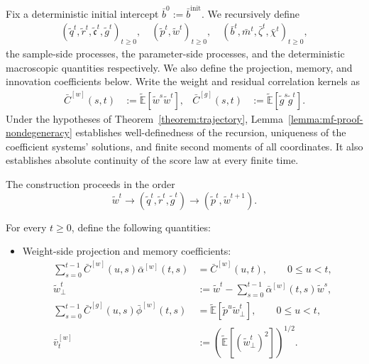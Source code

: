 \begin{definition}
\label{def:mean-field-recursion}
Fix a deterministic initial intercept $\bar b^0:=\bar b^{\mathrm{init}}$. We recursively define 
\begin{align*}
    (\tilde q^t,\tilde r^t,\tilde{\mathfrak c}^t,\tilde g^t)_{t\ge0}, 
    \quad 
    (\tilde p^t,\tilde w^t)_{t\ge0},
    \quad
    (\bar b^t,\bar m^t,\bar\zeta^t,\bar\chi^t)_{t\ge0},
\end{align*}
the sample-side processes, the parameter-side processes, and the deterministic macroscopic quantities respectively. We also define the projection, memory, and innovation coefficients below.
Write the weight and residual correlation kernels as
\begin{align}
    \bar C^{[w]}(s,t)
    &:=
    \tilde{\mathbb E}
    [
        \tilde w^s\tilde w^t
    ],
    &
    \bar C^{[g]}(s,t)
    &:=
    \tilde{\mathbb E}
    [
        \tilde g^s\tilde g^t
    ].
    \label{eq:correlation-kernel-definition}
\end{align}
Under the hypotheses of Theorem~\ref{theorem:trajectory},
Lemma~\ref{lemma:mf-proof-nondegeneracy} establishes
well-definedness of the recursion, uniqueness of the
coefficient systems' solutions, and finite second moments
of all coordinates. It also establishes absolute continuity
of the score law at every finite time.

The construction proceeds in the order
\[
    \tilde w^t
    \longrightarrow(\tilde q^t,\tilde r^t,\tilde g^t)
    \longrightarrow(\tilde p^t,\tilde w^{t+1}).
\]

For every $t\ge0$, define the following quantities:

\begin{itemize}[wide]
    \item Weight-side projection and memory coefficients:
    \begin{align}
    \sum_{s=0}^{t-1}
        \bar C^{[w]}(u,s)\bar\alpha^{[w]}(t,s)
    &=
    \bar C^{[w]}(u,t),
    \qquad 0\le u<t,
    \label{eq:alpha-w-definition}
    \\[-7pt]
    \tilde w_\perp^t
    &:=
    \tilde w^t
    -
    \sum_{s=0}^{t-1}
        \bar\alpha^{[w]}(t,s)\tilde w^s,
    \\[-7pt]
    \sum_{s=0}^{t-1}
        \bar C^{[g]}(u,s)\bar\phi^{[w]}(t,s)
    &=
    \tilde{\mathbb E}
    [
        \tilde p^u\tilde w_\perp^t
    ],
    \qquad 0\le u<t,
    \label{eq:phi-w-definition}
    \\[-7pt]
    \bar v_t^{[w]}
    &:=
    \left(
        \tilde{\mathbb E}
        [
            (\tilde w_\perp^t)^2
        ]
    \right)^{1/2}.
\end{align}


\end{itemize}
\end{definition}
